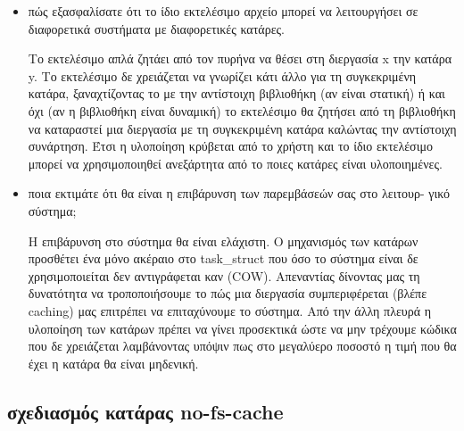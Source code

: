\documentclass[a4paper,10pt]{article} \usepackage{anysize}
\begin{document}
\begin{itemize}
    \item πώς εξασφαλίσατε ότι το ίδιο εκτελέσιμο αρχείο μπορεί να λειτουργήσει σε
        διαφορετικά συστήματα με διαφορετικές κατάρες.

        Το εκτελέσιμο απλά ζητάει από τον πυρήνα να θέσει στη διεργασία x την
        κατάρα y. Το εκτελέσιμο δε χρειάζεται να γνωρίζει κάτι άλλο για τη
        συγκεκριμένη κατάρα, ξαναχτίζοντας το με την αντίστοιχη βιβλιοθήκη (αν
        είναι στατική) ή και όχι (αν η βιβλιοθήκη είναι δυναμική) το
        εκτελέσιμο θα ζητήσει από τη βιβλιοθήκη να καταραστεί μια διεργασία με
        τη συγκεκριμένη κατάρα καλώντας την αντίστοιχη συνάρτηση. Έτσι η
        υλοποίηση κρύβεται από το χρήστη και το ίδιο εκτελέσιμο μπορεί να
        χρησιμοποιηθεί ανεξάρτητα από το ποιες κατάρες είναι υλοποιημένες.

    \item ποια εκτιμάτε ότι θα είναι η επιβάρυνση των παρεμβάσεών σας στο λειτουρ-
        γικό σύστημα;

        Η επιβάρυνση στο σύστημα θα είναι ελάχιστη. Ο μηχανισμός των κατάρων
        προσθέτει ένα μόνο ακέραιο στο task\_struct που όσο το σύστημα είναι
        δε χρησιμοποιείται δεν αντιγράφεται καν (COW). Απεναντίας δίνοντας μας
        τη δυνατότητα να τροποποιήσουμε το πώς μια διεργασία συμπεριφέρεται
        (βλέπε caching) μας επιτρέπει να επιταχύνουμε το σύστημα. Από την άλλη
        πλευρά η υλοποίηση των κατάρων πρέπει να γίνει προσεκτικά ώστε να μην
        τρέχουμε κώδικα που δε χρειάζεται λαμβάνοντας υπόψιν πως στο μεγαλύερο
        ποσοστό η τιμή που θα έχει η κατάρα θα είναι μηδενική.

\end{itemize}
\subsection*{σχεδιασμός κατάρας no-fs-cache}
\end{document}
